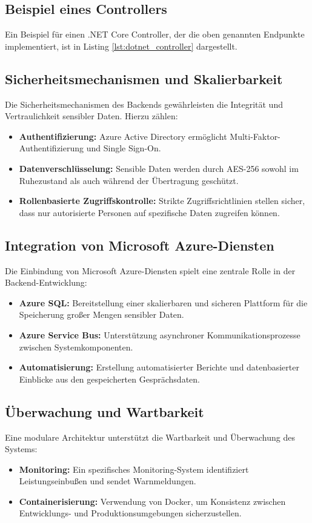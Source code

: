 \subsection{Beispiel eines Controllers}
Ein Beispiel für einen .NET Core Controller, der die oben genannten Endpunkte implementiert, ist in Listing \ref{lst:dotnet_controller} dargestellt.




\subsection{Sicherheitsmechanismen und Skalierbarkeit}
Die Sicherheitsmechanismen des Backends gewährleisten die Integrität und Vertraulichkeit sensibler Daten. Hierzu zählen:
\begin{itemize}
    \item \textbf{Authentifizierung:} Azure Active Directory ermöglicht Multi-Faktor-Authentifizierung und Single Sign-On.
    \item \textbf{Datenverschlüsselung:} Sensible Daten werden durch AES-256 sowohl im Ruhezustand als auch während der Übertragung geschützt.
    \item \textbf{Rollenbasierte Zugriffskontrolle:} Strikte Zugriffsrichtlinien stellen sicher, dass nur autorisierte Personen auf spezifische Daten zugreifen können.
\end{itemize}

\subsection{Integration von Microsoft Azure-Diensten}
Die Einbindung von Microsoft Azure-Diensten spielt eine zentrale Rolle in der Backend-Entwicklung:
\begin{itemize}
    \item \textbf{Azure SQL:} Bereitstellung einer skalierbaren und sicheren Plattform für die Speicherung großer Mengen sensibler Daten.
    \item \textbf{Azure Service Bus:} Unterstützung asynchroner Kommunikationsprozesse zwischen Systemkomponenten.
    \item \textbf{Automatisierung:} Erstellung automatisierter Berichte und datenbasierter Einblicke aus den gespeicherten Gesprächsdaten.
\end{itemize}

\subsection{Überwachung und Wartbarkeit}
Eine modulare Architektur unterstützt die Wartbarkeit und Überwachung des Systems:
\begin{itemize}
    \item \textbf{Monitoring:} Ein spezifisches Monitoring-System identifiziert Leistungseinbußen und sendet Warnmeldungen.
    \item \textbf{Containerisierung:} Verwendung von Docker, um Konsistenz zwischen Entwicklungs- und Produktionsumgebungen sicherzustellen.
\end{itemize}

